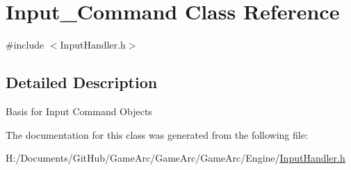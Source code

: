 \hypertarget{class_input___command}{\section{Input\+\_\+\+Command Class Reference}
\label{class_input___command}
}


{\ttfamily \#include $<$Input\+Handler.\+h$>$}



\subsection{Detailed Description}
Basis for Input Command Objects 

The documentation for this class was generated from the following file\+:\begin{DoxyCompactItemize}
\item 
H\+:/\+Documents/\+Git\+Hub/\+Game\+Arc/\+Game\+Arc/\+Game\+Arc/\+Engine/\hyperlink{_input_handler_8h}{Input\+Handler.\+h}\end{DoxyCompactItemize}
